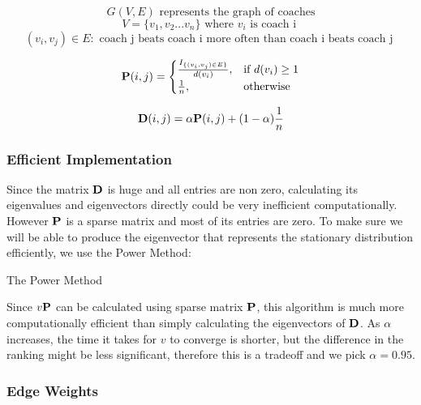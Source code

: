 \documentclass[11pt,notitlepage]{article}
\begin{document}
$$G(V, E) \mbox{ represents the graph of coaches}$$
$$V = \{v_1, v_2 ... v_n\} \mbox{ where } v_i \mbox{ is coach i }$$
$$(v_i, v_j) \in E : \mbox{ coach j beats coach i more often than coach i beats coach j }$$



\[
    {\bf P} (i, j)= 
\begin{cases}
    \frac{ I_{\{(v_i, v_j) \in E\}}}{d(v_i)},& \text{if } d(v_i) \geq 1\\
    \frac{1}{n},              & \text{otherwise}
\end{cases}
\]

$${\bf D} (i, j) = \alpha {\bf P} (i, j)  + (1-\alpha)\frac{1}{n}$$


\subsubsection*{Efficient Implementation}


Since the matrix ${\bf D}$ is huge and all entries are non zero, calculating its eigenvalues and eigenvectors directly could be very inefficient computationally. However ${\bf P}$ is a sparse matrix and most of its entries are zero. To make sure we will be able to produce the eigenvector that represents the stationary distribution efficiently, we use the Power Method:

\vspace{5mm}

\begin{algorithm}[H]
\caption{The Power Method}
\begin{algorithmic}
\EndWhile
{}
\end{algorithmic}
\end{algorithm}

\vspace{5mm}

\noindent Since $v {\bf P}$ can be calculated using sparse matrix ${\bf P}$, this algorithm is much more computationally efficient than simply calculating the eigenvectors of ${\bf D}$. As $\alpha$ increases, the time it takes for $v$ to converge is shorter, but the difference in the ranking might be less significant, therefore this is a tradeoff and we pick $\alpha = 0.95$.

\subsubsection*{Edge Weights}
\end{document}
